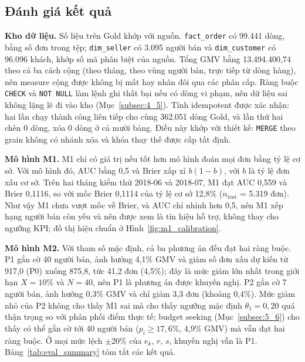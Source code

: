 \documentclass[a4paper]{article}
\begin{document}
\subsection{Đánh giá kết quả}
\label{subsec:6_2}

\textbf{Kho dữ liệu.} Số liệu trên Gold khớp với nguồn. \texttt{fact\_order} có 99.441 dòng, bằng số đơn trong tệp; \texttt{dim\_seller} có 3.095 người bán và \texttt{dim\_customer} có 96.096 khách, khớp số mã phân biệt của nguồn. Tổng GMV bằng 13.494.400,74 theo cả ba cách cộng (theo tháng, theo vùng người bán, trực tiếp từ dòng hàng), nên measure cộng được không bị mất hay nhân đôi qua các phân cấp. Ràng buộc \texttt{CHECK} và \texttt{NOT NULL} làm lệnh ghi thất bại nếu có dòng vi phạm, nên dữ liệu sai không lặng lẽ đi vào kho (Mục~\ref{subsec:4_5}). Tính idempotent được xác nhận: hai lần chạy thành công liên tiếp cho cùng 362.051 dòng Gold, và lần thứ hai chèn 0 dòng, xóa 0 dòng ở cả mười bảng. Điều này khớp với thiết kế: \texttt{MERGE} theo grain không có nhánh xóa và khóa thay thế được cấp tất định.

\textbf{Mô hình M1.} M1 chỉ có giá trị nếu tốt hơn mô hình đoán mọi đơn bằng tỷ lệ cơ sở. Với mô hình đó, AUC bằng 0,5 và Brier xấp xỉ $b(1-b)$, với $b$ là tỷ lệ đơn xấu cơ sở. Trên hai tháng kiểm thử 2018-06 và 2018-07, M1 đạt AUC 0,559 và Brier 0,1116, so với mốc Brier 0,1114 của tỷ lệ cơ sở 12,8\% ($n_{\text{test}}$ = 5.319 đơn). Như vậy M1 chưa vượt mốc về Brier, và AUC chỉ nhỉnh hơn 0,5, nên M1 xếp hạng người bán còn yếu và nên được xem là tín hiệu hỗ trợ, không thay cho ngưỡng KPI; đồ thị hiệu chuẩn ở Hình~\ref{fig:m1_calibration}.

\textbf{Mô hình M2.} Với tham số mặc định, cả ba phương án đều đạt hai ràng buộc. P1 gắn cờ 40 người bán, ảnh hưởng 4,1\% GMV và giảm số đơn xấu dự kiến từ 917,0 (P0) xuống 875,8, tức 41,2 đơn (4,5\%); đây là mức giảm lớn nhất trong giới hạn $X = 10\%$ và $N = 40$, nên P1 là phương án được khuyến nghị. P2 gắn cờ 7 người bán, ảnh hưởng 0,3\% GMV và chỉ giảm 3,3 đơn (khoảng 0,4\%). Mức giảm nhỏ của P2 không cho thấy M1 sai mà cho thấy ngưỡng mặc định $\theta_1 = 0{,}20$ quá thận trọng so với phân phối điểm thực tế; budget seeking (Mục~\ref{subsec:5_6}) cho thấy có thể gắn cờ tới 40 người bán ($p_i \ge 17{,}6\%$, 4,9\% GMV) mà vẫn đạt hai ràng buộc. Ở mọi mức lệch $\pm 20\%$ của $e_k$, $r$, $s$, khuyến nghị vẫn là P1. Bảng~\ref{tab:eval_summary} tóm tắt các kết quả.
\end{document}
